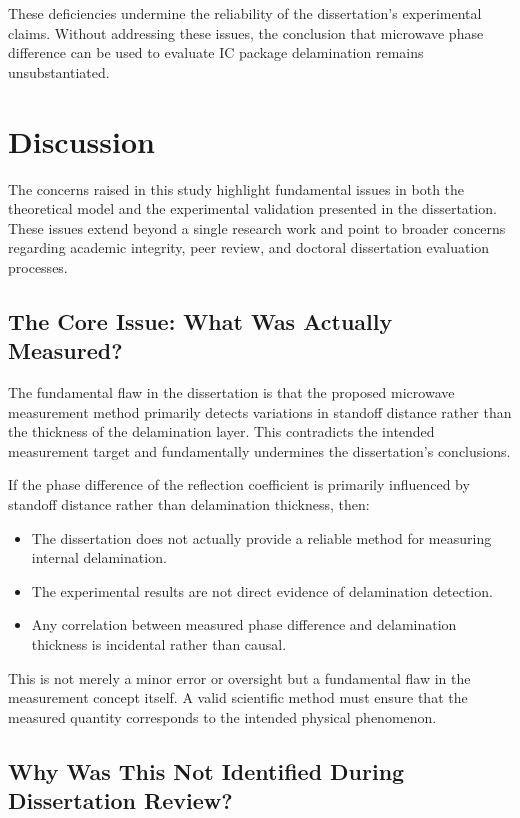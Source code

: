 \documentclass[10pt,twocolumn]{article}
\begin{document}
These deficiencies undermine the reliability of the dissertation’s experimental claims. Without addressing these issues, the conclusion that microwave phase difference can be used to evaluate IC package delamination remains unsubstantiated.

\section{Discussion}

The concerns raised in this study highlight fundamental issues in both the theoretical model and the experimental validation presented in the dissertation. These issues extend beyond a single research work and point to broader concerns regarding academic integrity, peer review, and doctoral dissertation evaluation processes.

\subsection{The Core Issue: What Was Actually Measured?}

The fundamental flaw in the dissertation is that the proposed microwave measurement method primarily detects variations in standoff distance rather than the thickness of the delamination layer. This contradicts the intended measurement target and fundamentally undermines the dissertation’s conclusions. 

If the phase difference of the reflection coefficient is primarily influenced by standoff distance rather than delamination thickness, then:
\begin{itemize}
    \item The dissertation does not actually provide a reliable method for measuring internal delamination.
    \item The experimental results are not direct evidence of delamination detection.
    \item Any correlation between measured phase difference and delamination thickness is incidental rather than causal.
\end{itemize}

This is not merely a minor error or oversight but a fundamental flaw in the measurement concept itself. A valid scientific method must ensure that the measured quantity corresponds to the intended physical phenomenon.

\subsection{Why Was This Not Identified During Dissertation Review?}
\end{document}
